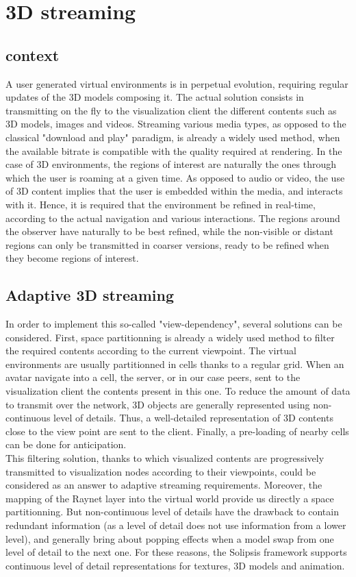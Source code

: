 \section{3D streaming}
\subsection{context}
A user generated virtual environments is in perpetual evolution, requiring regular updates of the 3D models composing it. The actual solution consists in transmitting on the fly to the visualization client the different contents such as 3D models, images and videos. Streaming various media types, as opposed to the classical "download and play" paradigm, is already a widely used method, when the available bitrate is compatible with the quality required at rendering. 
In the case of 3D environments, the regions of interest are naturally the ones through which the user is roaming at a given time. As opposed to audio or video, the use of 3D content implies that the user is embedded within the media, and interacts with it. Hence, it is required that the environment be refined in real-time, according to the actual navigation and various interactions. The regions around the observer have naturally to be best refined, while the non-visible or distant regions can only be transmitted in coarser versions, ready to be refined when they become regions of interest.

\subsection{Adaptive 3D streaming}
In order to implement this so-called "view-dependency", several solutions can be considered. First, space partitionning is already a widely used method to filter the required contents according to the current viewpoint. The virtual environments are usually partitionned in cells thanks to a regular grid. When an avatar navigate into a cell, the server, or in our case peers, sent to the visualization client the contents present in this one. To reduce the amount of data to transmit over the network, 3D objects are generally represented using non-continuous level of details. Thus, a well-detailed representation of 3D contents close to the view point are sent to the client. Finally, a pre-loading of nearby cells can be done for anticipation.\\
This filtering solution, thanks to which visualized contents are progressively transmitted to visualization nodes according to their viewpoints, could be considered as an answer to adaptive streaming requirements. Moreover, the mapping of the Raynet layer into the virtual world provide us directly a space partitionning. But non-continuous level of details have the drawback to contain redundant information (as a level of detail does not use information from a lower level), and generally bring about popping effects when a model swap from one level of detail to the next one. For these reasons, the Solipsis framework supports continuous level of detail representations for textures, 3D models and animation.
